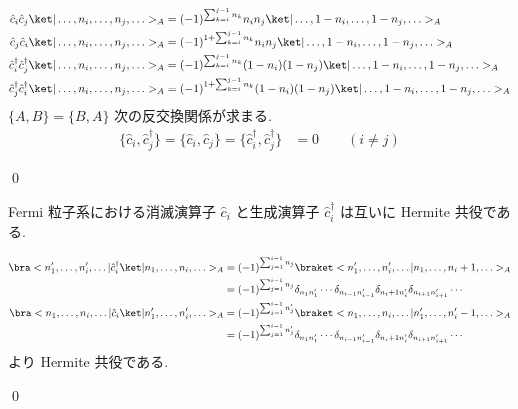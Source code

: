 \documentclass[uplatex,dvipdfmx,a4paper,11pt]{jlreq}
\makeatletter
\numberwithin{equation}{section}
\theoremstyle{definition}
\renewenvironment{proof}[1][\proofname]{\par
  \normalfont
  \topsep6\p@\@plus6\p@ \trivlist
  \item[\hskip\labelsep{\bfseries #1}\@addpunct{\bfseries}]\ignorespaces\quad\par
}{
  \qed\endtrivlist\@endpefalse
}
\renewcommand\proofname{証明}
\makeatother
\begin{document}
\begin{proof}
\begin{align}
    \hat{c}_i\hat{c}_j\ket|\ldots,n_i,\ldots,n_j,\ldots>_A                 & = (-1)^{\sum_{k=i}^{j-1}n_k}n_in_j\ket|\ldots,1-n_i,\ldots,1-n_j,\ldots>_A                 \\
    \hat{c}_j\hat{c}_i\ket|\ldots,n_i,\ldots,n_j,\ldots>_A                 & = (-1)^{1 + \sum_{k=i}^{j-1}n_k}n_in_j\ket|\ldots,1-n_i,\ldots,1-n_j,\ldots>_A             \\
    \hat{c}_i^\dagger\hat{c}_j^\dagger\ket|\ldots,n_i,\ldots,n_j,\ldots>_A & = (-1)^{\sum_{k=i}^{j-1}n_k}(1 - n_i)(1 - n_j)\ket|\ldots,1-n_i,\ldots,1-n_j,\ldots>_A     \\
    \hat{c}_j^\dagger\hat{c}_i^\dagger\ket|\ldots,n_i,\ldots,n_j,\ldots>_A & = (-1)^{1 + \sum_{k=i}^{j-1}n_k}(1 - n_i)(1 - n_j)\ket|\ldots,1-n_i,\ldots,1-n_j,\ldots>_A
  \end{align}
  $\{A, B\} = \{B, A\}$ 次の反交換関係が求まる.
  \begin{align}
    \{\hat{c}_i, \hat{c}_j^\dagger\} = \{\hat{c}_i, \hat{c}_j\} = \{\hat{c}_i^\dagger, \hat{c}_j^\dagger\} & = 0 \qquad (i\neq j)
  \end{align}
\end{proof}

\begin{proposition}
  Fermi 粒子系における消滅演算子 $\hat{c}_i$ と生成演算子 $\hat{c}_i^\dagger$ は互いに Hermite 共役である.
\end{proposition}
\begin{proof}
  \begin{align}
    \bra<n_1',\ldots,n_i',\ldots|\hat{c}_i^\dagger\ket|n_1,\ldots,n_i,\ldots>_A & = (-1)^{\sum_{j=1}^{i-1}n_j}\braket<n_1',\ldots,n_i',\ldots|n_1,\ldots,n_i+1,\ldots>_A                                        \\
                                                                                & = (-1)^{\sum_{j=1}^{i-1}n_j}\delta_{n_1n_1'}\cdots\delta_{n_{i-1}n_{i-1}'}\delta_{n_i+1n_{i}'}\delta_{n_{i+1}n_{i+1}'}\cdots  \\
    \bra<n_1,\ldots,n_i,\ldots|\hat{c}_i\ket|n_1',\ldots,n_i',\ldots>_A         & = (-1)^{\sum_{j=1}^{i-1}n_j'}\braket<n_1,\ldots,n_i,\ldots|n_1',\ldots,n_i'-1,\ldots>_A                                       \\
                                                                                & = (-1)^{\sum_{j=1}^{i-1}n_j'}\delta_{n_1n_1'}\cdots\delta_{n_{i-1}n_{i-1}'}\delta_{n_i+1n_{i}'}\delta_{n_{i+1}n_{i+1}'}\cdots
  \end{align}
  より Hermite 共役である.
\end{proof}
\end{document}
